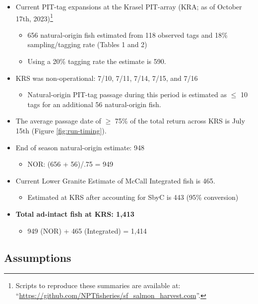 \documentclass[11pt,a4paper,]{article}
\providecommand{\tightlist}{%
  \setlength{\itemsep}{0pt}\setlength{\parskip}{0pt}}
\begin{document}
\begin{itemize}
\item
  Current PIT-tag expansions at the Krasel PIT-array (KRA; as of October 17th, 2023)\footnote{Scripts to reproduce these summaries are available at: ``\url{https://github.com/NPTfisheries/sf_salmon_harvest.com}''.}

  \begin{itemize}
  \tightlist
  \item
    656 natural-origin fish estimated from 118 observed tags and 18\% sampling/tagging rate (Tables 1 and 2)
  \item
    Using a 20\% tagging rate the estimate is 590.
  \end{itemize}
\item
  KRS was non-operational: 7/10, 7/11, 7/14, 7/15, and 7/16

  \begin{itemize}
  \tightlist
  \item
    Natural-origin PIT-tag passage during this period is estimated as \(\le\) 10 tags for an additional 56 natural-origin fish.
  \end{itemize}
\item
  The average passage date of \(\ge\) 75\% of the total return across KRS is July 15th (Figure \ref{fig:run-timing}).
\item
  End of season natural-origin estimate: 948

  \begin{itemize}
  \tightlist
  \item
    NOR: (656 + 56)/.75 = 949
  \end{itemize}
\item
  Current Lower Granite Estimate of McCall Integrated fish is 465.

  \begin{itemize}
  \tightlist
  \item
    Estimated at KRS after accounting for SbyC is 443 (95\% conversion)
  \end{itemize}
\item
  \textbf{Total ad-intact fish at KRS: 1,413}

  \begin{itemize}
  \tightlist
  \item
    949 (NOR) + 465 (Integrated) = 1,414
  \end{itemize}
\end{itemize}

\hypertarget{assumptions}{%
\subsection{Assumptions}\label{assumptions}}
\end{document}

